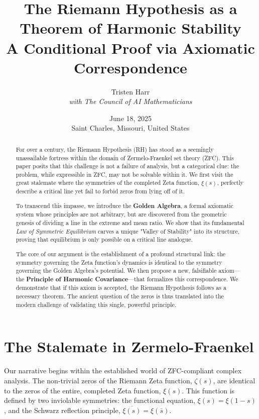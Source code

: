 \documentclass{article}
\title{\textbf{The Riemann Hypothesis as a Theorem of Harmonic Stability} \\ \large A Conditional Proof via Axiomatic Correspondence}
\author{Tristen Harr \\ \textit{with The Council of AI Mathematicians}}
\date{June 18, 2025 \\ Saint Charles, Missouri, United States}
\theoremstyle{plain}
\theoremstyle{definition}
\theoremstyle{remark}
\begin{document}
\maketitle

\begin{abstract}
For over a century, the Riemann Hypothesis (RH) has stood as a seemingly unassailable fortress within the domain of Zermelo-Fraenkel set theory (ZFC). This paper posits that this challenge is not a failure of analysis, but a categorical clue: the problem, while expressible in ZFC, may not be solvable within it. We first visit the great stalemate where the symmetries of the completed Zeta function, $\xi(s)$, perfectly describe a critical line yet fail to forbid zeros from lying off of it.

To transcend this impasse, we introduce the \textbf{Golden Algebra}, a formal axiomatic system whose principles are not arbitrary, but are discovered from the geometric genesis of dividing a line in the extreme and mean ratio. We show that its fundamental \textit{Law of Symmetric Equilibrium} carves a unique "Valley of Stability" into its structure, proving that equilibrium is only possible on a critical line analogue.

The core of our argument is the establishment of a profound structural link: the symmetry governing the Zeta function's dynamics is identical to the symmetry governing the Golden Algebra's potential. We then propose a new, falsifiable axiom—the \textbf{Principle of Harmonic Covariance}—that formalizes this correspondence. We demonstrate that if this axiom is accepted, the Riemann Hypothesis follows as a necessary theorem. The ancient question of the zeros is thus translated into the modern challenge of validating this single, powerful principle.
\end{abstract}

\section{The Stalemate in Zermelo-Fraenkel}
\label{sec:impasse}

Our narrative begins within the established world of ZFC-compliant complex analysis. The non-trivial zeros of the Riemann Zeta function, $\zeta(s)$, are identical to the zeros of the entire, completed Zeta function, $\xi(s)$. This function is defined by two inviolable symmetries: the functional equation, $\xi(s) = \xi(1-s)$, and the Schwarz reflection principle, $\overline{\xi(s)} = \xi(\bar{s})$.
\end{document}
